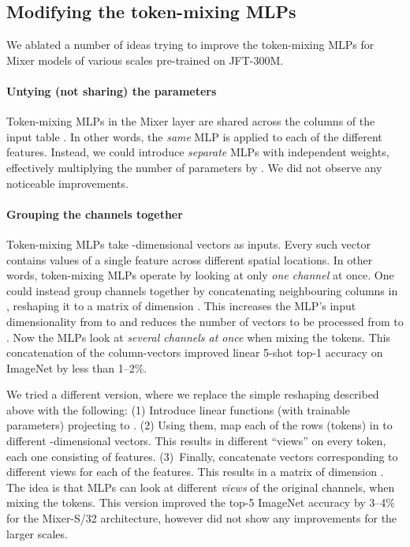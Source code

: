 \documentclass{article}
\newcommand{\name}{Mixer}
\begin{document}
\subsection{Modifying the token-mixing MLPs}
\label{appendix:did-not-work}

We ablated a number of ideas trying to improve the token-mixing MLPs for \name{} models of various scales pre-trained on JFT-300M.

\paragraph{Untying (not sharing) the parameters}

Token-mixing MLPs in the \name{} layer are shared across the columns of the input table .
In other words, the \emph{same} MLP is applied to each of the  different features.
Instead, we could introduce  \emph{separate} MLPs with independent weights, effectively multiplying the number of parameters by .
We did not observe any noticeable improvements.

\paragraph{Grouping the channels together}

Token-mixing MLPs take -dimensional vectors as inputs.
Every such vector contains values of a single feature across  different spatial locations.
In other words, token-mixing MLPs operate by looking at only \emph{one channel} at once.
One could instead group channels together by concatenating  neighbouring columns in , reshaping it to a matrix of dimension .
This increases the MLP's input dimensionality from  to  and reduces the number of vectors to be processed from  to .
Now the MLPs look at \emph{several channels at once} when mixing the tokens.
This concatenation of the column-vectors improved linear 5-shot top-1 accuracy on ImageNet by less than 1--2\%.

We tried a different version, where we replace the simple reshaping described above with the following:
(1) Introduce  linear functions (with trainable parameters) projecting  to .
(2) Using them, map each of the  rows (tokens) in  to  different -dimensional vectors.
This results in  different ``views'' on every token, each one consisting of  features.
(3)~Finally, concatenate vectors corresponding to  different views for each of the  features. This results in a matrix of dimension .
The idea is that MLPs can look at  different \emph{views} of the original channels, when mixing the tokens.
This version improved the top-5 ImageNet accuracy by 3--4\% for the \name{}-S/32 architecture, however did not show any improvements for the larger scales.
\end{document}
